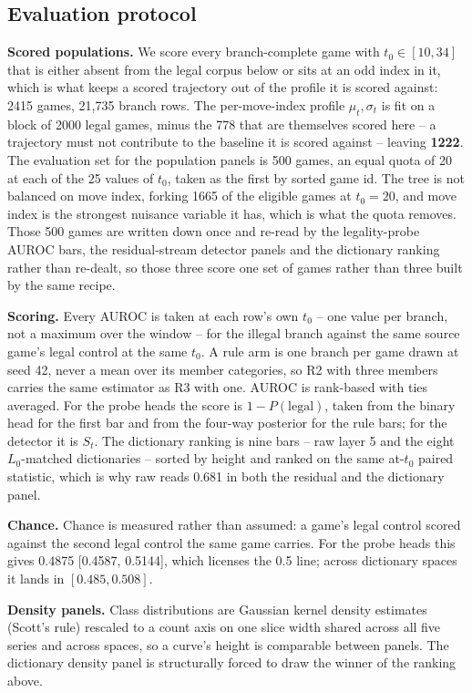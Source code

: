 \subsection{Evaluation protocol}

\textbf{Scored populations.} We score every branch-complete game with $t_0 \in [10, 34]$ that is
either absent from the legal corpus below or sits at an odd index in it, which is what keeps a
scored trajectory out of the profile it is scored against: 2415 games, 21,735 branch rows. The
per-move-index profile $\mu_t, \sigma_t$ is fit on a block of 2000 legal games, minus the 778
that are themselves scored here -- a trajectory must not contribute to the baseline it is scored
against -- leaving \textbf{1222}. The evaluation set for the population panels is 500 games, an
equal quota of 20 at each of the 25 values of $t_0$, taken as the first by sorted game id. The
tree is not balanced on move index, forking 1665 of the eligible games at $t_0 = 20$, and move
index is the strongest nuisance variable it has, which is what the quota removes. Those 500 games
are written down once and re-read by the legality-probe AUROC bars, the residual-stream detector
panels and the dictionary ranking rather than re-dealt, so those three score one set of games
rather than three built by the same recipe.

\textbf{Scoring.} Every AUROC is taken at each row's own $t_0$ -- one value per branch, not a
maximum over the window -- for the illegal branch against the same source game's legal control at
the same $t_0$. A rule arm is one branch per game drawn at seed 42, never a mean over its member
categories, so R2 with three members carries the same estimator as R3 with one. AUROC is
rank-based with ties averaged. For the probe heads the score is $1 - P(\text{legal})$, taken from
the binary head for the first bar and from the four-way posterior for the rule bars; for the
detector it is $S_t$. The dictionary ranking is nine bars -- raw layer 5 and the eight
$L_0$-matched dictionaries -- sorted by height and ranked on the same at-$t_0$ paired statistic,
which is why raw reads 0.681 in both the residual and the dictionary panel.

\textbf{Chance.} Chance is measured rather than assumed: a game's legal control scored against
the second legal control the same game carries. For the probe heads this gives 0.4875 [0.4587,
0.5144], which licenses the 0.5 line; across dictionary spaces it lands in $[0.485, 0.508]$.

\textbf{Density panels.} Class distributions are Gaussian kernel density estimates (Scott's rule)
rescaled to a count axis on one slice width shared across all five series and across spaces, so a
curve's height is comparable between panels. The dictionary density panel is structurally forced
to draw the winner of the ranking above.

